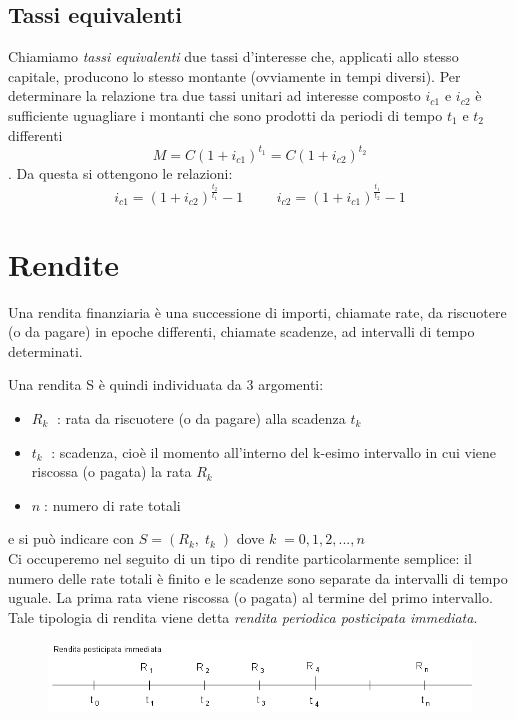 \subsection{Tassi equivalenti}

Chiamiamo \emph{tassi equivalenti} due tassi d'interesse che, applicati allo stesso capitale,
producono lo stesso montante (ovviamente in tempi diversi).
Per determinare la relazione tra due tassi unitari ad interesse composto 
$i_{c1}$ e $i_{c2}$ è sufficiente uguagliare i montanti che sono prodotti da 
periodi di tempo $t_1$ e $t_2$ differenti
$$M = C(1+i_{c1})^{t_1} = C(1+i_{c2})^{t_2}$$.
Da questa si ottengono le relazioni:
$$i_{c1} = (1+i_{c2})^\frac{t_2}{t_1}-1 \hspace{1cm} i_{c2} = (1+i_{c1})^\frac{t_1}{t_2}-1$$



\section{Rendite}
Una rendita finanziaria è una successione di importi, chiamate rate, da 
riscuotere (o da pagare) in epoche differenti, chiamate scadenze, ad intervalli 
di tempo determinati. 

Una rendita S è quindi individuata da 3 argomenti:

\begin {itemize}[noitemsep]
\item $R_k\;$ : rata da riscuotere (o da pagare) alla scadenza $t_k\;$
\item $t_k\;$ : scadenza, cioè il momento all'interno del k-esimo intervallo in 
cui viene riscossa (o pagata) la rata $R_k\;$
\item $n\;$: numero di rate totali
\end{itemize}

e si può indicare con $ S= ( R_k , \; t_k\;)$  dove $ k \;=0,1,2,...,n$
\\[4pt]
Ci occuperemo nel seguito di un tipo di rendite particolarmente semplice:
il numero delle rate totali è finito e le scadenze sono separate da intervalli 
di tempo uguale. La prima rata viene riscossa (o pagata) 
al termine del primo intervallo. Tale tipologia di rendita viene detta \emph{rendita 
periodica posticipata immediata}.

\begin{figure}[htp]
\centering
\includegraphics[scale=.60]{img/rendite.png}
\caption{}
\label{}
\end{figure}

